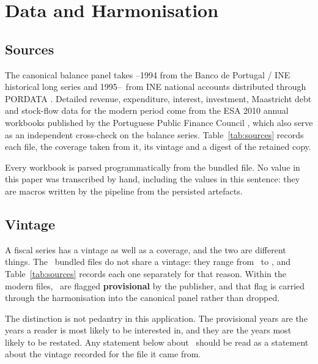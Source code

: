 
\section{Data and Harmonisation}
\label{sec:data}

\subsection{Sources}

The canonical balance panel takes \PanelStart--1994 from the Banco de Portugal /
INE historical long series \citep{bportugal_series} and 1995--\PanelEnd\ from INE
national accounts distributed through PORDATA \citep{pordata_2785}. Detailed
revenue, expenditure, interest, investment, Maastricht debt and stock-flow data for
the modern period come from the ESA 2010 annual workbooks published by the
Portuguese Public Finance Council \citep{cfp_data}, which also serve as an
independent cross-check on the balance series. Table~\ref{tab:sources} records each
file, the coverage taken from it, its vintage and a digest of the retained copy.

Every workbook is parsed programmatically from the bundled file. No value in this
paper was transcribed by hand, including the values in this sentence: they are
macros written by the pipeline from the persisted artefacts.



\subsection{Vintage}

A fiscal series has a vintage as well as a coverage, and the two are different
things. The \SourceCount\ bundled files do not share a vintage: they range from
\VintageEarliest\ to \VintageLatest, and Table~\ref{tab:sources} records each one
separately for that reason. Within the modern files, \ProvisionalYears\ are flagged
\textbf{provisional} by the publisher, and that flag is carried through the
harmonisation into the canonical panel rather than dropped.

The distinction is not pedantry in this application. The provisional years are the
years a reader is most likely to be interested in, and they are the years most
likely to be restated. Any statement below about \ProvisionalYears\ should be read
as a statement about the vintage recorded for the file it came from.

